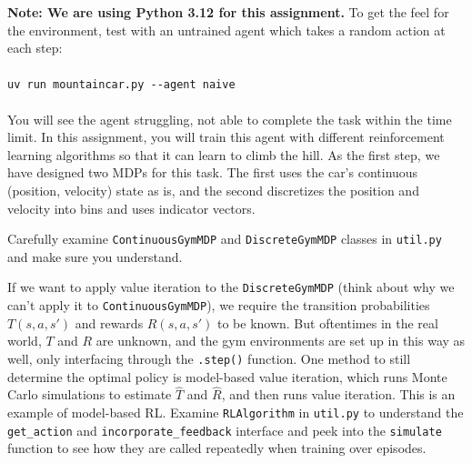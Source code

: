 \documentclass{article}
\theoremstyle{case}
\theoremstyle{definition}
\begin{document}
\textbf{Note: We are using Python 3.12 for this assignment.} To get the feel for the environment, test with an untrained agent which takes a random action at each step:
\\
\\
\verb|uv run mountaincar.py --agent naive|
\\
\\
You will see the agent struggling, not able to complete the task within the time limit.
In this assignment, you will train this agent with different reinforcement learning algorithms so that it can learn to climb the hill.
As the first step, we have designed two MDPs for this task. The first uses the car's continuous (position, velocity) state as is, and the second discretizes
the position and velocity into bins and uses indicator vectors.

Carefully examine \texttt{ContinuousGymMDP} and \texttt{DiscreteGymMDP} classes in \texttt{util.py} and make sure you understand.

If we want to apply value iteration to the \texttt{DiscreteGymMDP} (think about why we can't apply it to \texttt{ContinuousGymMDP}),
we require the transition probabilities $T(s, a, s')$ and rewards $R(s, a, s')$ to be known. But oftentimes in the real world, $T$ and $R$ are unknown,
and the gym environments are set up in this way as well, only interfacing through the \texttt{.step()} function. One method
to still determine the optimal policy is model-based value iteration, which runs Monte Carlo simulations to estimate $\hat{T}$ and $\hat{R}$, and then runs value iteration.
This is an example of model-based RL. Examine \texttt{RLAlgorithm} in \texttt{util.py} to understand the \texttt{get\_action} and \texttt{incorporate\_feedback} interface
and peek into the \texttt{simulate} function to see how they are called repeatedly when training over episodes.
\end{document}
